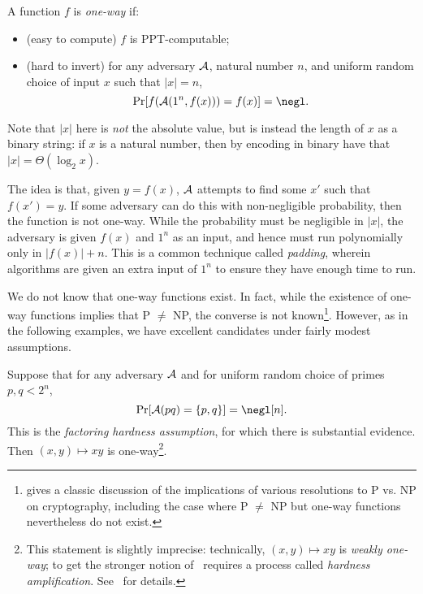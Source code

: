 \begin{dfn}\label{def:one-way function}
  A function $f$ is \emph{one-way} if:
  \begin{itemize}
    \item (easy to compute) $f$ is PPT-computable;
    \item (hard to invert) for any adversary $\mathcal{A}$, natural number $n$, and
      uniform random choice of input $x$ such that $|x| = n$, \[
        \Pr[f(\cA(1^n, f(x))) = f(x)] = \negl.
      \]
  \end{itemize}
  Note that $|x|$ here is \emph{not} the absolute value, but is instead the
  length of $x$ as a binary string: if $x$ is a natural number, then by encoding
  in binary have that $|x| = \Theta(\log_2 x)$.
\end{dfn}

The idea is that, given $y = f(x)$, $\mathcal{A}$ attempts to find some $x'$ such that
$f(x') = y$. If some adversary can do this with non-negligible probability, then the
function is not one-way. While the probability must be negligible in $|x|$, the
adversary is given $f(x)$ and $1^n$ as an input, and hence must run polynomially
only in $|f(x)| + n$. This is a common technique called \emph{padding}, wherein
algorithms are given an extra input of $1^n$ to ensure they have enough time to
run.

We do not know that one-way functions exist. In fact, while the existence of
one-way functions implies that P $\neq$ NP, the converse is not
known\footnote{\cite{impagliazzo-1995} gives a classic discussion of the
  implications of various resolutions to P vs. NP on cryptography, including the
case where P $\neq$ NP but one-way functions nevertheless do not exist.}.
However, as in the following examples, we have excellent candidates under fairly
modest assumptions.

\begin{ex}
  Suppose that for any adversary $\mathcal{A}$ and for uniform random choice of primes
  $p,q<2^n$, \[
    \Pr[\cA(pq) = \{p, q\}] = \negl[n].
  \] This is the \emph{factoring hardness assumption}, for which there is
  substantial evidence. Then $(x,y)\mapsto xy$ is one-way\footnote{This
    statement is slightly imprecise: technically, $(x,y)\mapsto xy$ is \emph{weakly
    one-way}; to get the stronger notion of~
    requires a process called \emph{hardness
    amplification}. See~\cite[Section 2.4]{pass-shelat-2020}
for details.}.
\end{ex}

